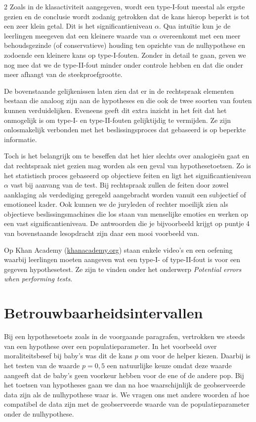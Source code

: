 \begin{multicols}{2}
Zoals in de klasactiviteit aangegeven, wordt een type-I-fout meestal als ergste gezien en de conclusie wordt zodanig getrokken dat de kans hierop beperkt is tot een zeer klein getal. Dit is het significantieniveau $\alpha$. Qua intu\"itie kun je de leerlingen meegeven dat een kleinere waarde van $\alpha$ overeenkomt met een meer behoudsgezinde (of conservatieve) houding ten opzichte van de nulhypothese en zodoende een kleinere kans op type-I-fouten. Zonder in detail te gaan, geven we nog mee dat we de type-II-fout minder onder controle hebben en dat die onder meer afhangt van de steekproefgrootte.

De bovenstaande gelijkenissen laten zien dat er in de rechtspraak elementen bestaan die analoog zijn aan de hypotheses en die ook de twee soorten van fouten kunnen verduidelijken. Eveneens geeft dit extra inzicht in het feit dat het onmogelijk is om type-I- en type-II-fouten gelijktijdig te vermijden. Ze zijn onlosmakelijk verbonden met het beslissingsproces dat gebaseerd is op beperkte informatie.

Toch is het belangrijk om te beseffen dat het hier slechts over analogie\"en gaat en dat rechtspraak niet gezien mag worden als een geval van hypothesetoetsen. Zo is het statistisch proces gebaseerd op objectieve feiten en ligt het significantieniveau $\alpha$ vast bij aanvang van de test. Bij rechtspraak zullen de feiten door zowel aanklaging als verdediging geregeld aangebracht worden vanuit een subjectief of emotioneel kader. Ook kunnen we de juryleden of rechter moeilijk zien als objectieve beslissingsmachines die los staan van menselijke emoties en werken op een vast significantieniveau. De antwoorden die je bijvoorbeeld krijgt op puntje 4 van bovenstaande lesopdracht zijn daar een mooi voorbeeld van.  

Op Khan Academy (\url{khanacademy.org}) staan enkele video's en een oefening waarbij leerlingen moeten aangeven wat een type-I- of type-II-fout is voor een gegeven hypothesetest. Ze zijn te vinden onder het onderwerp \emph{Potential errors when performing tests}.
 
\section{Betrouwbaarheidsintervallen} \label{S_5}
Bij een hypothesetoets zoals in de voorgaande paragrafen, vertrokken we steeds van een hypothese over een populatieparameter. In het voorbeeld over moraliteitsbesef bij baby's was dit de kans $p$ om voor de helper kiezen. Daarbij is het testen van de waarde $p=0,5$ een natuurlijke keuze omdat deze waarde aangeeft dat de baby's geen voorkeur hebben voor de ene of de andere pop. Bij het toetsen van hypotheses gaan we dan na hoe waarschijnlijk de geobserveerde data zijn als de nulhypothese waar is. We vragen ons met andere woorden af hoe compatibel de data zijn met de geobserveerde waarde van de populatieparameter onder de nulhypothese. %


\end{multicols}
